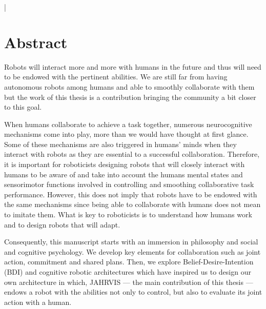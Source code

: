 \documentclass[english,a4paper,11pt,twoside]{StyleThese}
\begin{document}
\lstMakeShortInline[columns=fixed,breaklines=false]|
\makeflyleaf

\cleardoublepage

\dominitoc


 \cleardoublepage


\chapter*{Abstract}

Robots will interact more and more with humans in the future and thus will need to be endowed with the pertinent abilities. We are still far from having autonomous robots among humans and able to smoothly collaborate with them but the work of this thesis is a contribution bringing the community a bit closer to this goal. 


When humans collaborate to achieve a task together, numerous neurocognitive mechanisms come into play, more than we would have thought at first glance. Some of these mechanisms are also triggered in humans’ minds when they interact with robots as they are essential to a successful collaboration. Therefore, it is important for roboticists designing robots that will closely interact with humans to be aware of and take into account the humans mental states and sensorimotor functions involved in controlling and smoothing collaborative task performance. However, this does not imply that robots have to be endowed with the same mechanisms since being able to collaborate with humans does not mean to imitate them. What is key to roboticists is to understand how humans work and to design  robots that will adapt. 


Consequently, this manuscript starts with an immersion in philosophy and social and cognitive psychology. We develop key elements for collaboration such as joint action, commitment and shared plans. Then, we explore Belief-Desire-Intention (BDI) and cognitive robotic architectures  which have inspired us to design our own architecture in which, JAHRVIS —  the main contribution of this thesis — endows a robot with the abilities not only to control, but also to evaluate its joint action with a human. 
\end{document}

